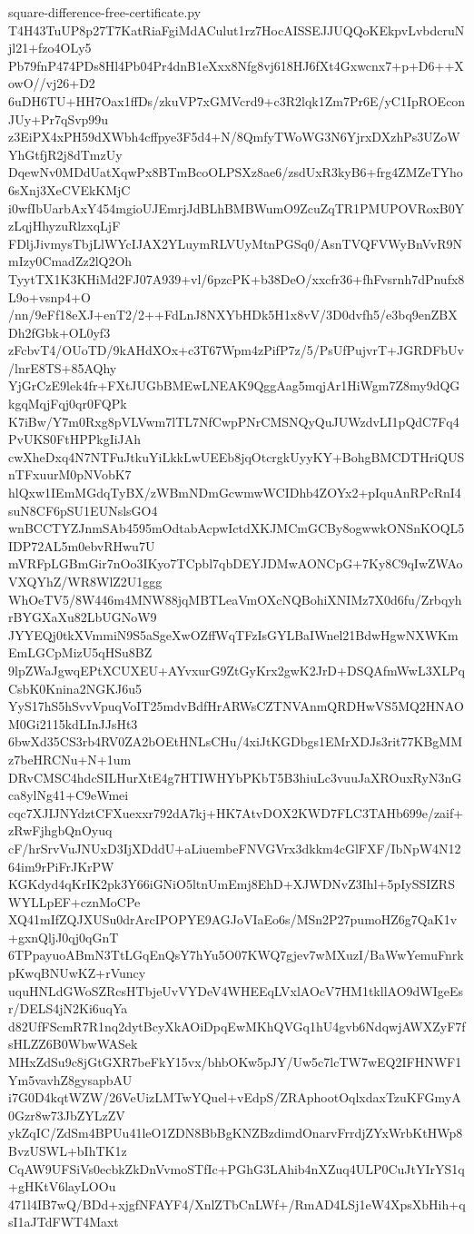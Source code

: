 \documentclass[11pt]{article}
\theoremstyle{definition}
\theoremstyle{remark}
\begin{document}
\begin{filecontents*}[overwrite]{square-difference-free-certificate.py}
T4H43TuUP8p27T7KatRiaFgiMdACulut1rz7HocAISSEJJUQQoKEkpvLvbdcruNjl21+fzo4OLy5
Pb79fnP474PDs8Hl4Pb04Pr4dnB1eXxx8Nfg8vj618HJ6fXt4Gxwcnx7+p+D6++XowO//vj26+D2
6uDH6TU+HH7Oax1ffDs/zkuVP7xGMVcrd9+c3R2lqk1Zm7Pr6E/yC1IpROEconJUy+Pr7qSvp99u
z3EiPX4xPH59dXWbh4cffpye3F5d4+N/8QmfyTWoWG3N6YjrxDXzhPs3UZoWYhGtfjR2j8dTmzUy
DqewNv0MDdUatXqwPx8BTmBcoOLPSXz8ae6/zsdUxR3kyB6+frg4ZMZeTYho6sXnj3XeCVEkKMjC
i0wfIbUarbAxY454mgioUJEmrjJdBLhBMBWumO9ZcuZqTR1PMUPOVRoxB0YzLqjHhyzuRlzxqLjF
FDljJivmysTbjLlWYcIJAX2YLuymRLVUyMtnPGSq0/AsnTVQFVWyBnVvR9NmIzy0CmadZz2lQ2Oh
TyytTX1K3KHiMd2FJ07A939+vl/6pzcPK+b38DeO/xxcfr36+fhFvsrnh7dPnufx8L9o+vsnp4+O
/nn/9eFf18eXJ+enT2/2++FdLnJ8NXYbHDk5H1x8vV/3D0dvfh5/e3bq9enZBXDh2fGbk+OL0yf3
zFcbvT4/OUoTD/9kAHdXOx+c3T67Wpm4zPifP7z/5/PsUfPujvrT+JGRDFbUv/lnrE8TS+85AQhy
YjGrCzE9lek4fr+FXtJUGbBMEwLNEAK9QggAag5mqjAr1HiWgm7Z8my9dQGkgqMqjFqj0qr0FQPk
K7iBw/Y7m0Rxg8pVLVwm7lTL7NfCwpPNrCMSNQyQuJUWzdvLI1pQdC7Fq4PvUKS0FtHPPkgIiJAh
cwXheDxq4N7NTFuJtkuYiLkkLwUEEb8jqOtcrgkUyyKY+BohgBMCDTHriQUSnTFxuurM0pNVobK7
hlQxw1IEmMGdqTyBX/zWBmNDmGcwmwWCIDhb4ZOYx2+pIquAnRPcRnI4suN8CF6pSU1EUNslsGO4
wnBCCTYZJnmSAb4595mOdtabAcpwIctdXKJMCmGCBy8ogwwkONSnKOQL5IDP72AL5m0ebvRHwu7U
mVRFpLGBmGir7nOo3IKyo7TCpbl7qbDEYJDMwAONCpG+7Ky8C9qIwZWAoVXQYhZ/WR8WlZ2U1ggg
WhOeTV5/8W446m4MNW88jqMBTLeaVmOXcNQBohiXNIMz7X0d6fu/ZrbqyhrBYGXaXu82LbUGNoW9
JYYEQj0tkXVmmiN9S5aSgeXwOZffWqTFzIsGYLBaIWnel21BdwHgwNXWKmEmLGCpMizU5qHSu8BZ
9lpZWaJgwqEPtXCUXEU+AYvxurG9ZtGyKrx2gwK2JrD+DSQAfmWwL3XLPqCsbK0Knina2NGKJ6u5
YyS17hS5hSvvVpuqVoIT25mdvBdfHrARWsCZTNVAnmQRDHwVS5MQ2HNAOM0Gi2115kdLInJJsHt3
6bwXd35CS3rb4RV0ZA2bOEtHNLsCHu/4xiJtKGDbgs1EMrXDJs3rit77KBgMMz7beHRCNu+N+1um
DRvCMSC4hdcSILHurXtE4g7HTIWHYbPKbT5B3hiuLc3vuuJaXROuxRyN3nGca8ylNg41+C9eWmei
cqc7XJIJNYdztCFXuexxr792dA7kj+HK7AtvDOX2KWD7FLC3TAHb699e/zaif+zRwFjhgbQnOyuq
cF/hrSrvVuJNUxD3IjXDddU+aLiuembeFNVGVrx3dkkm4cGlFXF/IbNpW4N1264im9rPiFrJKrPW
KGKdyd4qKrIK2pk3Y66iGNiO5ltnUmEmj8EhD+XJWDNvZ3Ihl+5pIySSIZRSWYLLpEF+cznMoCPe
XQ41mIfZQJXUSu0drArcIPOPYE9AGJoVIaEo6s/MSn2P27pumoHZ6g7QaK1v+gxnQljJ0qj0qGnT
6TPpayuoABmN3TtLGqEnQsY7hYu5O07KWQ7gjev7wMXuzI/BaWwYemuFnrkpKwqBNUwKZ+rVuncy
uquHNLdGWoSZRcsHTbjeUvVYDeV4WHEEqLVxlAOcV7HM1tkllAO9dWIgeEsr/DELS4jN2Ki6uqYa
d82UfFScmR7R1nq2dytBcyXkAOiDpqEwMKhQVGq1hU4gvb6NdqwjAWXZyF7fsHLZZ6B0WbwWASek
MHxZdSu9c8jGtGXR7beFkY15vx/bhbOKw5pJY/Uw5c7lcTW7wEQ2IFHNWF1Ym5vavhZ8gysapbAU
i7G0D4kqtWZW/26VeUizLMTwYQuel+vEdpS/ZRAphootOqlxdaxTzuKFGmyA0Gzr8w73JbZYLzZV
ykZqIC/ZdSm4BPUu41leO1ZDN8BbBgKNZBzdimdOnarvFrrdjZYxWrbKtHWp8BvzUSWL+bIhTK1z
CqAW9UFSiVs0ecbkZkDnVvmoSTfIc+PGhG3LAhib4nXZuq4ULP0CuJtYIrYS1q+gHKtV6layLOOu
471l4IB7wQ/BDd+xjgfNFAYF4/XnlZTbCnLWf+/RmAD4LSj1eW4XpsXbHih+qsI1aJTdFWT4Maxt

\end{filecontents*}
\end{document}
